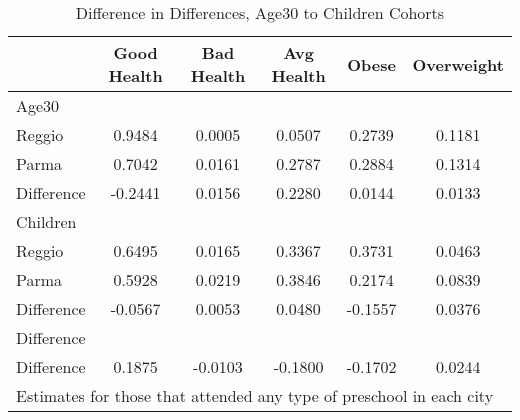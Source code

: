 \begin{table}[htbp]\centering
\caption{Difference in Differences, Age30 to Children Cohorts}
\begin{tabular}{l*{5}{c}}
\hline\hline
            & Good Health&  Bad Health&  Avg Health&       Obese&  Overweight\\
\hline
Age30       &            &            &            &            &            \\
Reggio      &      0.9484&      0.0005&      0.0507&      0.2739&      0.1181\\
Parma       &      0.7042&      0.0161&      0.2787&      0.2884&      0.1314\\
Difference  &     -0.2441&      0.0156&      0.2280&      0.0144&      0.0133\\
\hline
Children    &            &            &            &            &            \\
Reggio      &      0.6495&      0.0165&      0.3367&      0.3731&      0.0463\\
Parma       &      0.5928&      0.0219&      0.3846&      0.2174&      0.0839\\
Difference  &     -0.0567&      0.0053&      0.0480&     -0.1557&      0.0376\\
\hline
Difference  &            &            &            &            &            \\
Difference  &      0.1875&     -0.0103&     -0.1800&     -0.1702&      0.0244\\
\hline\hline
\multicolumn{6}{l}{\footnotesize Estimates for those that attended any type of preschool in each city}\\
\end{tabular}
\end{table}
